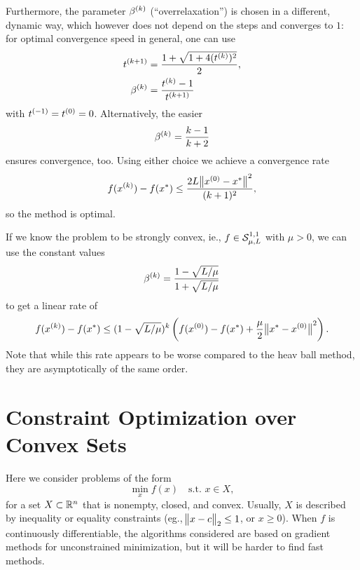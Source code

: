\documentclass{article}
\begin{document}
Furthermore, the parameter \(\kth{\beta}\) (``overrelaxation'') is chosen in a different, dynamic
way, which however does not depend on the steps and converges to \(1\): for optimal convergence
speed in general, one can use
\begin{align*}
  \kth[k+1]{t} &= \frac{1 + \sqrt{1 + 4(\kth{t})^2}}{2}, \\
  \kth{\beta} &= \frac{\kth{t} - 1}{\kth[k+1]{t}}
\end{align*}
with \(\kth[-1]{t} = \kth[0]{t} = 0\).  Alternatively, the easier
\begin{equation*}
  \kth{\beta} = \frac{k - 1}{k + 2}
\end{equation*}
ensures convergence, too. Using either choice we achieve a convergence rate
\begin{equation*}
  f(\kth{x}) - f(x^*) \leq \frac{2L\enVert[1]{\kth[0]{x} - x^*}^2}{(k + 1)^2},
\end{equation*}
so the method is optimal.

If we know the problem to be strongly convex, ie., \(f \in \Strong{\mu}{L}{1}{1}\) with \(\mu > 0\),
we can use the constant values
\begin{equation*}
  \kth{\beta} = \frac{1 - \sqrt{L/\mu}}{1 + \sqrt{L/\mu}}
\end{equation*}
to get a linear rate of
\begin{equation*}
  f(\kth{x}) - f(x^*) \leq (1 - \sqrt{L/\mu})^k
    \left( f(\kth[0]{x}) - f(x^*) + \frac{\mu}{2} \enVert[1]{x^* - \kth[0]{x}}^2 \right).
\end{equation*}
Note that while this rate appears to be worse compared to the heav ball method, they are
asymptotically of the same order.

\section{Constraint Optimization over Convex Sets}

\label{s:constrained-optimization-basics}

Here we consider problems of the form
\begin{equation*}
  \min_{x} f(x) \quad \text{s.t. } x \in X,
\end{equation*}
for a set \(X \subset \RR^n\) that is nonempty, closed, and convex.  Usually, \(X\) is described by
inequality or equality constraints (eg., \(\enVert[1]{x - c}_2 \leq 1\), or \(x \geq 0\)).  When
\(f\) is continuously differentiable, the algorithms considered are based on gradient methods for
unconstrained minimization, but it will be harder to find fast methods.
\end{document}
